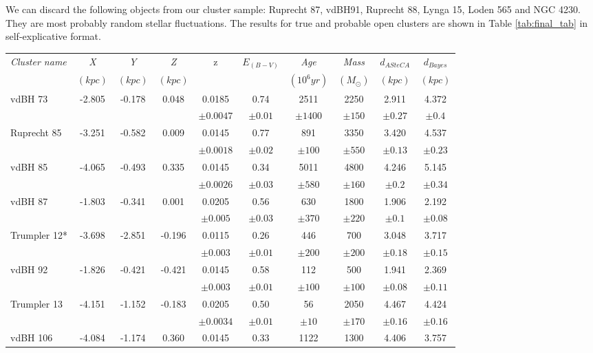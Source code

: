 \documentclass{aa}
\begin{document}
We can discard the following objects from our cluster sample: Ruprecht 87,
vdBH91, Ruprecht 88, Lynga 15, Loden 565 and NGC 4230. They are most probably
random stellar fluctuations. The results for true and probable open clusters are
shown in Table \ref{tab:final_tab} in self-explicative format.\\

\begin{table*}[ht]
\centering
\begin{tabular}{lccccccccc}
\hline
 \emph{Cluster name} & \emph{X} & \emph{Y} & \emph{Z} &
 z & $E_{(B-V)}$ & \emph{Age} & \emph{Mass} & $d_{ASteCA}$ & $d_{Bayes}$
 \\
 & $(kpc)$ & $(kpc)$ & $(kpc)$ & & & $(10^6 yr)$ & $(M_{\odot})$ & $(kpc)$
 & $(kpc)$\\
 \hline\hline
 vdBH 73 & -2.805 & -0.178 & 0.048 & 0.0185 & 0.74 & 2511 & 2250 & 2.911 & 4.372\\
 & & & & $\pm0.0047$ & $\pm0.01$ & $\pm1400$ & $\pm150$ & $\pm0.27$ & $\pm0.4$\\
 Ruprecht 85 & -3.251 & -0.582 & 0.009 & 0.0145 & 0.77 & 891 & 3350 & 3.420 & 4.537\\
 & & & & $\pm0.0018$ & $\pm0.02$ & $\pm100$ & $\pm550$ & $\pm0.13$ & $\pm0.23$ \\
  vdBH 85 & -4.065 & -0.493 & 0.335 & 0.0145 & 0.34 & 5011 & 4800 & 4.246 & 5.145 \\
 & & & & $\pm0.0026$ & $\pm0.03$ & $\pm580$ & $\pm160$ & $\pm0.2$ & $\pm0.34$ \\
 vdBH 87 & -1.803 & -0.341 & 0.001 & 0.0205 & 0.56 & 630 & 1800 & 1.906 & 2.192 \\
 & & & & $\pm0.005$ & $\pm0.03$ & $\pm370$ & $\pm220$ & $\pm0.1$ & $\pm0.08$ \\
 Trumpler 12* & -3.698 & -2.851 & -0.196 & 0.0115 & 0.26 & 446 & 700 & 3.048 & 3.717\\
 & & & & $\pm0.003$ & $\pm0.01$ & $\pm200$ & $\pm200$ & $\pm0.18$ & $\pm0.15$ \\
 vdBH 92 & -1.826 & -0.421 & -0.421 & 0.0145 & 0.58 & 112 & 500 & 1.941 & 2.369\\
 & & & & $\pm0.003$ & $\pm0.01$ & $\pm100$ & $\pm100$ & $\pm0.08$ & $\pm0.11$ \\
 Trumpler 13 & -4.151 & -1.152 & -0.183 & 0.0205 & 0.50 & 56 & 2050 & 4.467 & 4.424\\
 & & & & $\pm0.0034$ & $\pm0.01$ & $\pm10$ & $\pm170$ & $\pm0.16$ & $\pm0.16$ \\
 vdBH 106 & -4.084 & -1.174 & 0.360 & 0.0145 & 0.33 & 1122 & 1300 & 4.406 & 3.757\\

\end{tabular}
\end{table*}
\end{document}
